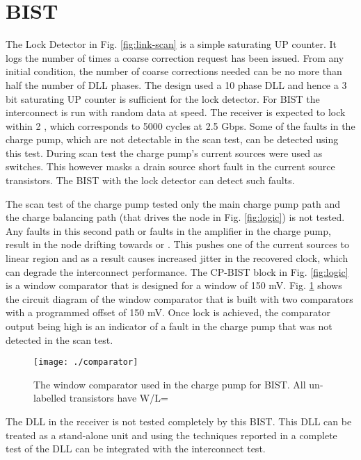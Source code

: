 \documentclass[conference]{IEEEtran}
\begin{document}
\section{BIST}
The Lock Detector in Fig. \ref{fig:link-scan} is a simple saturating UP counter. 
It logs the number of times a coarse correction request has been issued. 
From any initial 
condition, the number of coarse corrections needed can be no more than half 
the number of DLL phases. The design used a 10 phase DLL and hence a 3 
bit saturating UP counter is sufficient for the lock detector.
For BIST the interconnect is
run with random data at speed. The receiver 
is expected to lock within 2 , which corresponds to 5000 cycles at
2.5 Gbps. Some of the faults in the charge pump, which are not detectable
in the scan test, can be detected using this test. During scan
test the charge pump's current sources were used as switches. This
however masks a drain source short fault in the current source transistors.
The BIST with the lock detector can detect such faults.

The scan test of the charge pump tested only the main charge
pump path and the charge balancing path (that drives the node  in 
Fig. \ref{fig:logic}) is not tested. Any faults in this second
path or faults in the amplifier in the charge pump, result in the node  
drifting towards  or . 
This pushes one of the current sources to linear
region and as a result causes increased jitter in the recovered clock,
which can degrade the interconnect performance.
The CP-BIST block in Fig. \ref{fig:logic} is a window comparator 
that is designed for a window of 150 mV. Fig. \ref{fig:window-comp-dc} shows the
circuit diagram of the window comparator that is built with two 
comparators with a programmed offset of 150 mV. Once lock is achieved, the 
comparator output being high is an indicator of a fault in the charge pump that
was not detected in the scan test.

\begin{figure}[h!]
\centering
{}
\texttt{[image: ./comparator]}
\caption{The window comparator used in the charge pump for BIST.
All un-labelled transistors have W/L=}
\label{fig:window-comp-dc}
\end{figure}
The DLL in the receiver is not tested completely by this BIST. This DLL can
be treated as a stand-alone unit and using the techniques 
reported in \cite{bist-dll1,bist-dll2} a complete test of the DLL
can be integrated with the interconnect test.
\end{document}
